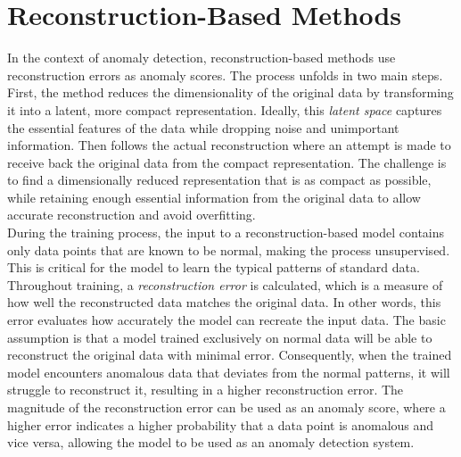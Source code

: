 
\section{Reconstruction-Based Methods}
In the context of anomaly detection, reconstruction-based methods use reconstruction errors as anomaly scores. The process unfolds in two main steps. First, the method reduces the dimensionality of the original data by transforming it into a latent, more compact representation. Ideally, this \textit{latent space} captures the essential features of the data while dropping noise and unimportant information. Then follows the actual reconstruction where an attempt is made to receive back the original data from the compact representation. The challenge is to find a dimensionally reduced representation that is as compact as possible, while retaining enough essential information from the original data to allow accurate reconstruction and avoid overfitting.\\
During the training process, the input to a reconstruction-based model contains only data points that are known to be normal, making the process unsupervised. This is critical for the model to learn the typical patterns of standard data. Throughout training, a \textit{reconstruction error} is calculated, which is a measure of how well the reconstructed data matches the original data. In other words, this error evaluates how accurately the model can recreate the input data.  The basic assumption is that a model trained exclusively on normal data will be able to reconstruct the original data with minimal error. Consequently, when the trained model encounters anomalous data that deviates from the normal patterns, it will struggle to reconstruct it, resulting in a higher reconstruction error. The magnitude of the reconstruction error can be used as an anomaly score, where a higher error indicates a higher probability that a data point is anomalous and vice versa, allowing the model to be used as an anomaly detection system.

